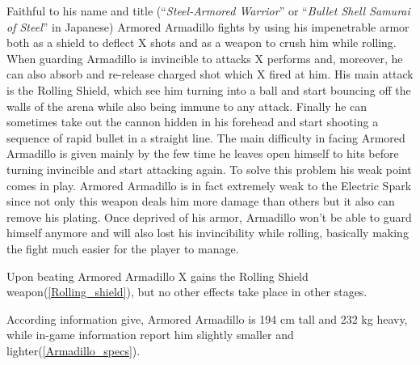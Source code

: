 Faithful to his name and title (``\textit{Steel-Armored Warrior}''\cite{MHX:manual} or ``\textit{Bullet Shell Samurai of Steel}''\cite{wayback:X_resources} in Japanese) Armored Armadillo fights by using his impenetrable armor both as a shield to deflect X shots and as a weapon to crush him while rolling. When guarding Armadillo is invincible to attacks X performs and, moreover, he can also absorb and re-release charged shot which X fired at him. His main attack is the Rolling Shield, which see him turning into a ball and start bouncing off the walls of the arena while also being immune to any attack. Finally he can sometimes take out the cannon hidden in his forehead and start shooting a sequence of rapid bullet in a straight line. The main difficulty in facing Armored Armadillo is given mainly by the few time he leaves open himself to hits before turning invincible and start attacking again. To solve this problem his weak point comes in play. Armored Armadillo is in fact extremely weak to the Electric Spark since not only this weapon deals him more damage than others but it also can remove his plating. Once deprived of his armor, Armadillo won't be able to guard himself anymore and will also lost his invincibility while rolling, basically making the fight much easier for the player to manage.

Upon beating Armored Armadillo X gains the Rolling Shield weapon(\ref{Rolling_shield}), but no other effects take place in other stages.

According information give, Armored Armadillo is 194 cm tall and 232 kg heavy, while in-game information report him slightly smaller and lighter(\ref{Armadillo_specs}).
